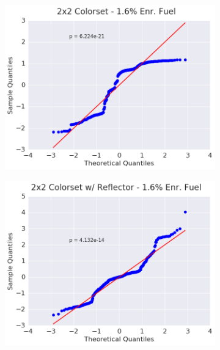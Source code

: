\begin{figure}[h!]
\begin{subfigure}{0.5\textwidth}
  \caption{}
  \label{fig:chap9-qq-assm-1.6-fiss}
\end{subfigure}
\begin{subfigure}{0.5\textwidth}
  \centering
  \includegraphics[width=\linewidth]{figures/patterns/2x2/quantile/16-enr-fiss-2}
  \caption{}
  \label{fig:chap9-qq-2x2-1.6-fiss}
\end{subfigure}%
\begin{subfigure}{0.5\textwidth}
  \centering
  \includegraphics[width=\linewidth]{figures/patterns/reflector/quantile/16-enr-fiss-2}  \caption{}
  \label{fig:chap9-qq-reflector-1.6-fiss}
\end{subfigure}

\end{figure}

